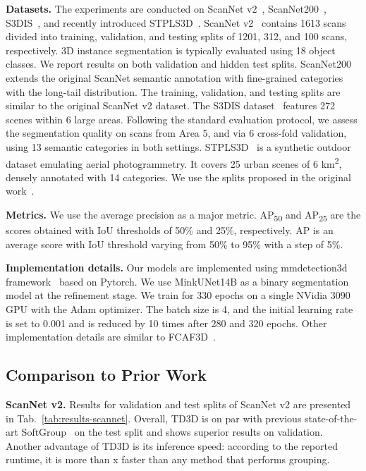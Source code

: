 \documentclass[10pt,twocolumn,letterpaper]{article}
\newcommand\inline{\noindent\textbf}
\begin{document}
\inline{Datasets.} The experiments are conducted on ScanNet v2~\cite{dai2017scannet}, ScanNet200~\cite{rozenberszki2022language}, S3DIS~\cite{armeni2016s3dis}, and recently introduced STPLS3D~\cite{chen2022stpls3d}. 
ScanNet v2~\cite{dai2017scannet} contains 1613 scans divided into training, validation, and testing splits of 1201, 312, and 100 scans, respectively. 3D instance segmentation is typically evaluated using 18 object classes. We report results on both validation and hidden test splits. ScanNet200~\cite{rozenberszki2022language} extends the original ScanNet semantic annotation with fine-grained categories with the long-tail distribution. The training, validation, and testing splits are similar to the original ScanNet v2 dataset. The S3DIS dataset~\cite{armeni2016s3dis} features 272 scenes within 6 large areas. Following the standard evaluation protocol, we assess the segmentation quality on scans from Area 5, and via 6 cross-fold validation, using 13 semantic categories in both settings. STPLS3D~\cite{chen2022stpls3d} is a synthetic outdoor dataset emulating aerial photogrammetry. It covers 25 urban scenes of 6 km\textsuperscript{2}, densely annotated with 14 categories. We use the splits proposed in the original work~\cite{chen2022stpls3d}.

\inline{Metrics.} We use the average precision as a major metric. AP\textsubscript{50} and AP\textsubscript{25} are the scores obtained with IoU thresholds of 50\% and 25\%, respectively. AP is an average score with IoU threshold varying from 50\% to 95\% with a step of 5\%. 

\inline{Implementation details.} 
Our models are implemented using mmdetection3d framework~\cite{mmdet3d2020} based on Pytorch. We use MinkUNet14B as a binary segmentation model at the refinement stage. We train for 330 epochs on a single NVidia 3090 GPU with the Adam optimizer. The batch size is 4, and the initial learning rate is set to 0.001 and is reduced by 10 times after 280 and 320 epochs. Other implementation details are similar to FCAF3D~\cite{rukhovich2022fcaf3d}.
\subsection{Comparison to Prior Work}
\label{ssec:comparison}

\inline{ScanNet v2.} Results for validation and test splits of ScanNet v2 are presented in Tab.~\ref{tab:results-scannet}. Overall, TD3D is on par with previous state-of-the-art SoftGroup~\cite{vu2022softgroup} on the test split and shows superior results on validation. Another advantage of TD3D is its inference speed: according to the reported runtime, it is more than x faster than any method that performs grouping.
\end{document}
